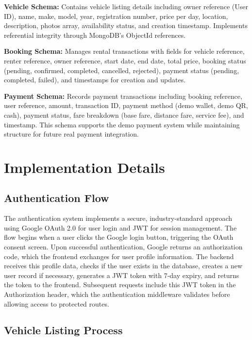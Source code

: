 \documentclass[12pt,a4paper]{report}
\begin{document}
	\textbf{Vehicle Schema:} Contains vehicle listing details including owner reference (User ID), name, make, model, year, registration number, price per day, location, description, photos array, availability status, and creation timestamp. Implements referential integrity through MongoDB's ObjectId references.
	
	\textbf{Booking Schema:} Manages rental transactions with fields for vehicle reference, renter reference, owner reference, start date, end date, total price, booking status (pending, confirmed, completed, cancelled, rejected), payment status (pending, completed, failed), and timestamps for creation and updates.
	
	\textbf{Payment Schema:} Records payment transactions including booking reference, user reference, amount, transaction ID, payment method (demo wallet, demo QR, cash), payment status, fare breakdown (base fare, distance fare, service fee), and timestamp. This schema supports the demo payment system while maintaining structure for future real payment integration.
	
	\section{Implementation Details}
	
	\subsection{Authentication Flow}
	
	The authentication system implements a secure, industry-standard approach using Google OAuth 2.0 for user login and JWT for session management. The flow begins when a user clicks the Google login button, triggering the OAuth consent screen. Upon successful authentication, Google returns an authorization code, which the frontend exchanges for user profile information. The backend receives this profile data, checks if the user exists in the database, creates a new user record if necessary, generates a JWT token with 7-day expiry, and returns the token to the frontend. Subsequent requests include this JWT token in the Authorization header, which the authentication middleware validates before allowing access to protected routes.
	
	\subsection{Vehicle Listing Process}
	
\end{document}
